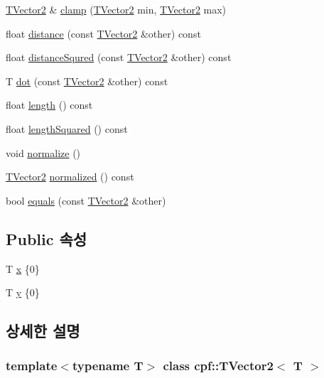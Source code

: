 \begin{DoxyCompactItemize}
\item 
\hyperlink{classcpf_1_1_t_vector2}{T\+Vector2} \& \hyperlink{classcpf_1_1_t_vector2_aef9e1a0af01a26c62f6fcb7de363e428}{clamp} (\hyperlink{classcpf_1_1_t_vector2}{T\+Vector2} min, \hyperlink{classcpf_1_1_t_vector2}{T\+Vector2} max)
\item 
float \hyperlink{classcpf_1_1_t_vector2_adf4c70b4e511d0c816e47b52956d1fa2}{distance} (const \hyperlink{classcpf_1_1_t_vector2}{T\+Vector2} \&other) const
\item 
float \hyperlink{classcpf_1_1_t_vector2_a1acd568ad6397353cd9a0638761d042f}{distance\+Squred} (const \hyperlink{classcpf_1_1_t_vector2}{T\+Vector2} \&other) const
\item 
T \hyperlink{classcpf_1_1_t_vector2_ac360f947c6e26a7ae146da86baaaa20e}{dot} (const \hyperlink{classcpf_1_1_t_vector2}{T\+Vector2} \&other) const
\item 
float \hyperlink{classcpf_1_1_t_vector2_a5b4a7067a062f9d91caf8a792e3dcccf}{length} () const
\item 
float \hyperlink{classcpf_1_1_t_vector2_a4e7d459775330c569777ede3b1424483}{length\+Squared} () const
\item 
void \hyperlink{classcpf_1_1_t_vector2_ab41c170e54eefd9a658168d1f8b729b3}{normalize} ()
\item 
\hyperlink{classcpf_1_1_t_vector2}{T\+Vector2} \hyperlink{classcpf_1_1_t_vector2_a10ee9140d296273ab65169f0e5671382}{normalized} () const
\item 
bool \hyperlink{classcpf_1_1_t_vector2_abaaf0150093f6e7d53bf82eb147cd039}{equals} (const \hyperlink{classcpf_1_1_t_vector2}{T\+Vector2} \&other)
\end{DoxyCompactItemize}
\subsection*{Public 속성}
\begin{DoxyCompactItemize}
\item 
T \hyperlink{classcpf_1_1_t_vector2_a2c0ac9258353351f1435070a2307e9e1}{x} \{0\}
\item 
T \hyperlink{classcpf_1_1_t_vector2_a727b923b39a876bbb13c810bcf6eecff}{y} \{0\}
\end{DoxyCompactItemize}


\subsection{상세한 설명}
\subsubsection*{template$<$typename T$>$\newline
class cpf\+::\+T\+Vector2$<$ T $>$}

